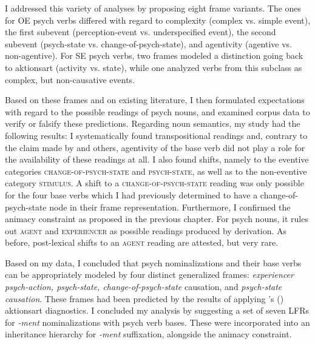 I addressed this variety of analyses by proposing eight frame variants. The ones for OE psych verbs differed with regard to complexity (complex vs. simple event), the first subevent (perception-event vs. underspecified event), the second subevent (psych-state vs. change-of-psych-state), and agentivity (agentive vs. non-agentive). For SE psych verbs, two frames modeled a distinction going back to aktionsart (activity vs. state), while one analyzed verbs from this subclass as complex, but non-causative events.

Based on these frames and on existing literature, I then formulated expectations with regard to the possible readings of psych nouns, and examined corpus data to verify or falsify these predictions. Regarding noun semantics, my study had the following results: I systematically found transpositional readings and, contrary to the claim made by \citet{Grimshaw.1990} and others, agentivity of the base verb did not play a role for the availability of these readings at all. I also found shifts, namely to the eventive categories \textsc{change-of-psych-state} and \textsc{psych-state}, as well as to the non-eventive category \textsc{stimulus}. A shift to a \textsc{change-of-psych-state} reading was only possible for the four base verbs which I had previously determined to have a change-of-psych-state node in their frame representation. Furthermore, I confirmed the animacy constraint as proposed in the previous chapter. For psych nouns, it rules out \textsc{agent} and \textsc{experiencer} as possible readings produced by derivation. As before, post-lexical shifts to an \textsc{agent} reading are attested, but very rare.

Based on my data, I concluded that psych nominalizations and their base verbs can be appropriately modeled by four distinct generalized frames: \textit{experiencer psych-action, psych-state, change-of-psych-state} causation, and \textit{psych-state causation}. These frames had been predicted by the results of applying \citeauthor{VanValin.2005}'s (\citeyear{VanValin.2005}) aktionsart diagnostics. I concluded my analysis by suggesting a set of seven LFRs for \textit{-ment} nominalizations with psych verb bases. These were incorporated into an inheritance hierarchy for \textit{-ment} suffixation, alongside the animacy constraint.
